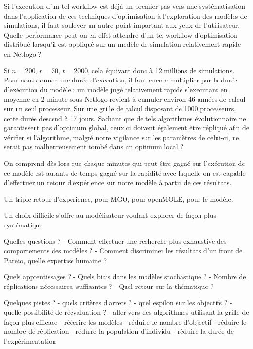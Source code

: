 Si l'execution d'un tel workflow est déjà un premier pas vers une systématisation dans l'application de ces techniques d'optimisation à l'exploration des modèles de simulations, il faut soulever un autre point important aux yeux de l'utilisateur. Quelle performance peut on en effet attendre d'un tel workflow d'optimisation distribué lorsqu'il est appliqué sur un modèle de simulation relativement rapide en Netlogo ?

Si $n=200$, $r = 30$, $t=2000$, cela équivaut donc à 12 millions de simulations. Pour nous donner une durée d'execution, il faut encore multiplier par la durée d'exécution du modèle : un modèle jugé relativement rapide s'executant en moyenne en 2 minute sous Netlogo revient à cumuler environ 46 années de calcul sur un seul processeur. Sur une grille de calcul disposant de 1000 processeurs, cette durée descend à 17 jours. Sachant que de tels algorithmes évolutionnaire ne garantissent pas d'optimum global, ceux ci doivent également être répliqué afin de vérifier si l'algorithme, malgré notre vigilance sur les paramètres de celui-ci, ne serait pas malheureusement tombé dans un optimum local ?

On comprend dès lors que chaque minutes qui peut être gagné sur l'exécution de ce modèle est autants de temps gagné sur la rapidité avec laquelle on est capable d'effectuer un retour d'expérience sur notre modèle à partir de ces résultats.


Un triple retour d'experience, pour MGO, pour openMOLE, pour le modèle.

Un choix difficile s'offre au modélisateur voulant explorer de façon plus systématique

Quelles questions ?
- Comment effectuer une recherche plus exhaustive des comportements des modèles ?
- Comment discriminer les résultats d'un front de Pareto, quelle expertise humaine ?

Quels apprentissages ?
- Quels biais dans les modèles stochastique ?
- Nombre de réplications nécessaires, suffisantes ?
- Quel retour sur la thématique ?

Quelques pistes ?
- quels critères d'arrets ?
- quel espilon sur les objectifs ?
- quelle possibilité de réévaluation ?
- aller vers des algorithmes utilisant la grille de façon plus efficace
- réécrire les modèles
- réduire le nombre d'objectif
- réduire le nombre de réplication
- réduire la population d'individu
- réduire la durée de l'expérimentation




